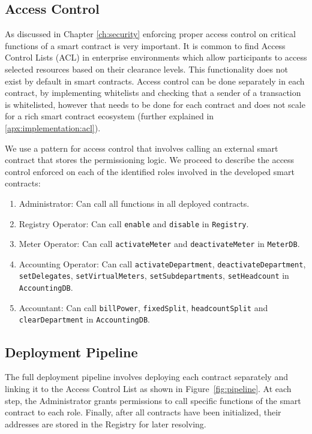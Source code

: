 \subsection{Access Control} \label{acl}
As discussed in Chapter \ref{ch:security} enforcing proper access control on critical functions of a smart contract is very important. It is common to find Access Control Lists (ACL) in enterprise environments which allow participants to access selected resources based on their clearance levels. This functionality does not exist by default in smart contracts. Access control can be done separately in each contract, by implementing whitelists and checking that a sender of a transaction is whitelisted, however that needs to be done for each contract and does not scale for a rich smart contract ecosystem (further explained in \ref{apx:implementation:acl}). 

We use a pattern for access control that involves calling an external smart contract that stores the permissioning logic. We proceed to describe the access control enforced on each of the identified roles involved in the developed smart contracts:
\begin{enumerate}
    \item Administrator: Can call all functions in all deployed contracts.
    \item Registry Operator: Can call \texttt{enable} and \texttt{disable} in \texttt{Registry}.
    \item Meter Operator: Can call \texttt{activateMeter} and \texttt{deactivateMeter} in \texttt{MeterDB}.
    \item Accounting Operator: Can call \texttt{activateDepartment}, \texttt{deactivateDepartment}, \texttt{setDelegates}, \texttt{setVirtualMeters}, \texttt{setSubdepartments}, \texttt{setHeadcount} in \texttt{AccountingDB}.
    \item Accountant: Can call \texttt{billPower}, \texttt{fixedSplit}, \texttt{headcountSplit} and \texttt{clearDepartment} in \texttt{AccountingDB}.
\end{enumerate}


\subsection{Deployment Pipeline}

The full deployment pipeline involves deploying each contract separately and linking it to the Access Control List as shown in Figure~\ref{fig:pipeline}. At each step, the Administrator grants permissions to call specific functions of the smart contract to each role. Finally, after all contracts have been initialized, their addresses are stored in the Registry for later resolving.


